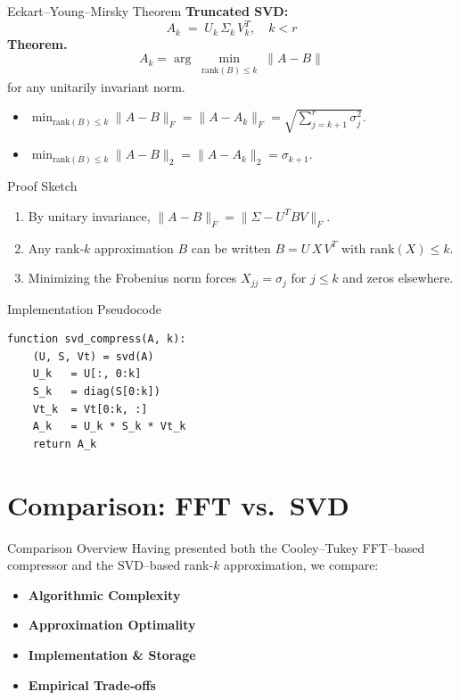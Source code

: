 \documentclass[12pt]{beamer}
\begin{document}
\begin{frame}{Eckart–Young–Mirsky Theorem}
  \textbf{Truncated SVD:}
  \[
    A_k \;=\; U_k\,\Sigma_k\,V_k^T,
    \quad
    k<r
  \]
  \vspace{1ex}
  \textbf{Theorem.}  
  \[
    A_k = \arg\min_{\substack{\mathrm{rank}(B)\le k}} \|A-B\|
  \]
  for any unitarily invariant norm.  
  \vspace{1ex}
  \begin{itemize}
    \item \(\displaystyle \min_{\mathrm{rank}(B)\le k}\|A-B\|_F = \|A - A_k\|_F = \sqrt{\sum_{j=k+1}^r\sigma_j^2}.\)
    \item \(\displaystyle \min_{\mathrm{rank}(B)\le k}\|A-B\|_2 = \|A - A_k\|_2 = \sigma_{k+1}.\)
  \end{itemize}
\end{frame}

\begin{frame}{Proof Sketch}
  \begin{enumerate}
    \item By unitary invariance, \(\|A - B\|_F = \|\Sigma - U^T B V\|_F\).
    \item Any rank‑\(k\) approximation \(B\) can be written \(B = U\,X\,V^T\) with \(\mathrm{rank}(X)\le k\).
    \item Minimizing the Frobenius norm forces \(X_{jj}=\sigma_j\) for \(j\le k\) and zeros elsewhere.
  \end{enumerate}
\end{frame}

\begin{frame}[fragile]{Implementation Pseudocode}
\begin{verbatim}
function svd_compress(A, k):
    (U, S, Vt) = svd(A)
    U_k   = U[:, 0:k]
    S_k   = diag(S[0:k])
    Vt_k  = Vt[0:k, :]
    A_k   = U_k * S_k * Vt_k
    return A_k
\end{verbatim}
\end{frame}


\section{Comparison: FFT vs.\ SVD}

\begin{frame}{Comparison Overview}
  Having presented both the Cooley–Tukey FFT–based compressor and the SVD–based rank‑$k$ approximation, we compare:
  \begin{itemize}
    \item \textbf{Algorithmic Complexity}
    \item \textbf{Approximation Optimality}
    \item \textbf{Implementation \& Storage}
    \item \textbf{Empirical Trade‑offs}
  \end{itemize}
\end{frame}
\end{document}
